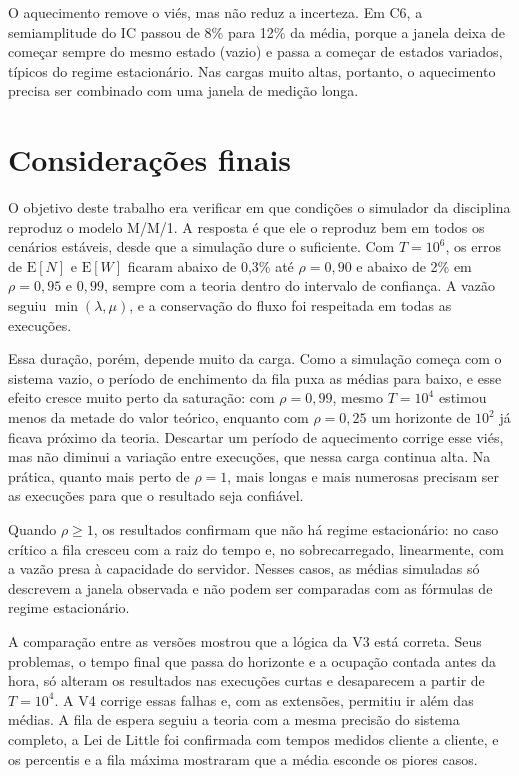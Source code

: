 \documentclass[
  article,      %
  10pt,         %
  oneside,
  a4paper,
  twocolumn,    %
  english,
  brazil        %
]{abntex2}
\newcommand{\EN}{\mathrm{E}[N]}
\newcommand{\EW}{\mathrm{E}[W]}
\begin{document}
O aquecimento remove o viés, mas não reduz a incerteza. Em C6, a semiamplitude do IC passou de 8\% para 12\% da média, porque a janela deixa de começar sempre do mesmo estado (vazio) e passa a começar de estados variados, típicos do regime estacionário. Nas cargas muito altas, portanto, o aquecimento precisa ser combinado com uma janela de medição longa.


\section{Considerações finais}

O objetivo deste trabalho era verificar em que condições o simulador da disciplina reproduz o modelo M/M/1. A resposta é que ele o reproduz bem em todos os cenários estáveis, desde que a simulação dure o suficiente. Com $T=10^6$, os erros de $\EN$ e $\EW$ ficaram abaixo de 0,3\% até $\rho=0{,}90$ e abaixo de 2\% em $\rho=0{,}95$ e $0{,}99$, sempre com a teoria dentro do intervalo de confiança. A vazão seguiu $\min(\lambda,\mu)$, e a conservação do fluxo foi respeitada em todas as execuções.

Essa duração, porém, depende muito da carga. Como a simulação começa com o sistema vazio, o período de enchimento da fila puxa as médias para baixo, e esse efeito cresce muito perto da saturação: com $\rho=0{,}99$, mesmo $T=10^4$ estimou menos da metade do valor teórico, enquanto com $\rho=0{,}25$ um horizonte de $10^2$ já ficava próximo da teoria. Descartar um período de aquecimento corrige esse viés, mas não diminui a variação entre execuções, que nessa carga continua alta. Na prática, quanto mais perto de $\rho=1$, mais longas e mais numerosas precisam ser as execuções para que o resultado seja confiável.

Quando $\rho\geq1$, os resultados confirmam que não há regime estacionário: no caso crítico a fila cresceu com a raiz do tempo e, no sobrecarregado, linearmente, com a vazão presa à capacidade do servidor. Nesses casos, as médias simuladas só descrevem a janela observada e não podem ser comparadas com as fórmulas de regime estacionário.

A comparação entre as versões mostrou que a lógica da V3 está correta. Seus problemas, o tempo final que passa do horizonte e a ocupação contada antes da hora, só alteram os resultados nas execuções curtas e desaparecem a partir de $T=10^4$. A V4 corrige essas falhas e, com as extensões, permitiu ir além das médias. A fila de espera seguiu a teoria com a mesma precisão do sistema completo, a Lei de Little foi confirmada com tempos medidos cliente a cliente, e os percentis e a fila máxima mostraram que a média esconde os piores casos.
\end{document}
